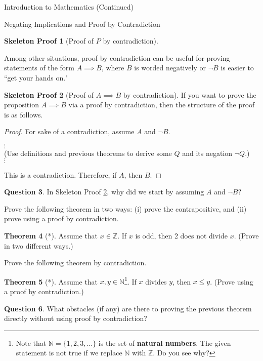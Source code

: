 \documentclass[11pt]{article}
\theoremstyle{definition}
\newtheorem{theorem}{Theorem}[section]
\newtheorem{question}[theorem]{Question}
\newtheorem{skeleton}[theorem]{Skeleton Proof}
\newenvironment{textbox}{\noindent\begin{lrbox}{\savepar}\begin{minipage}[c]{.98\textwidth}}{\end{minipage}\end{lrbox}\fcolorbox{black}{white}{\usebox{\savepar}}}
\begin{document}
\begin{section}{Introduction to Mathematics (Continued)}
\begin{subsection}{Negating Implications and Proof by Contradiction}
\begin{skeleton}[Proof of $P$ by contradiction]
\end{skeleton}

Among other situations, proof by contradiction can be useful for proving statements of the form $A\implies B$, where $B$ is worded negatively or $\neg B$ is easier to ``get your hands on."  

\begin{skeleton}[Proof of $A\implies B$ by contradiction]\label{pf by contradiction for implication}
If you want to prove the proposition $A\implies B$ via a proof by contradiction, then the structure of the proof is as follows.

\bigskip

\begin{textbox}
\begin{proof}
For sake of a contradiction, assume $A$ and $\neg B$.
\begin{center}
$\vdots$\\
(Use definitions and previous theorems to derive some $Q$ and its negation $\neg Q$.)\\
$\vdots$
\end{center}
\noindent This is a contradiction.  Therefore, if $A$, then $B$.
\end{proof}
\end{textbox}
\end{skeleton}

\begin{question}
In Skeleton Proof \ref{pf by contradiction for implication}, why did we start by assuming $A$ and $\neg B$?
\end{question}

Prove the following theorem in two ways: (i) prove the contrapositive, and (ii) prove using a proof by contradiction.

\begin{theorem}[*]
Assume that $x\in\mathbb{Z}$.  If $x$ is odd, then 2 does not divide $x$. (Prove in two different ways.)
\end{theorem}

Prove the following theorem by contradiction.

\begin{theorem}[*]
Assume that $x,y\in\mathbb{N}$\footnote{Note that $\mathbb{N}=\{1,2,3,\ldots\}$ is the set of \textbf{natural numbers}. The given statement is not true if we replace $\mathbb{N}$ with $\mathbb{Z}$.  Do you see why?}.  If $x$ divides $y$, then $x\leq y$. (Prove using a proof by contradiction.)
\end{theorem}

\begin{question}
What obstacles (if any) are there to proving the previous theorem directly without using proof by contradiction?
\end{question}

\end{subsection}

\end{section}
\end{document}
